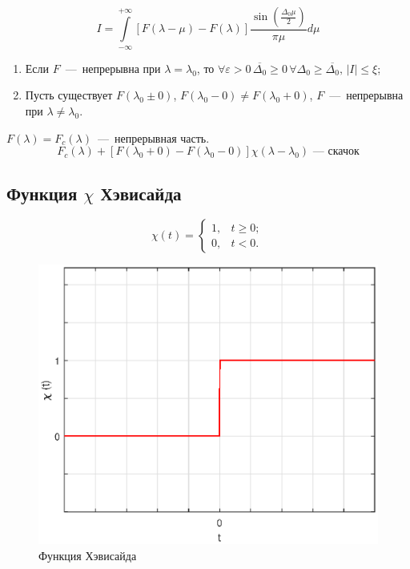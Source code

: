 \begin{equation*}
I = \int\limits_{-\infty}^{+\infty} [F(\lambda - \mu) - F(\lambda)]  \frac{\sin \left( \frac{\Delta_0 \mu}{2} \right)}{\pi \mu} d \mu
\end{equation*}

\begin{enumerate}

\item Если $F$~---~непрерывна при $\lambda = \lambda_0$, то $\forall \varepsilon >0 \,\overline{\Delta_0} \geq 0 \, \forall \Delta_0 \geq \overline{\Delta_0}, \, |I| \leq \xi$;

\item Пусть существует $F(\lambda_0 \pm 0)$, $F(\lambda_0 - 0) \neq F(\lambda_0 + 0)$, $F$~---~непрерывна при $\lambda \neq \lambda_0$.
\end{enumerate}

$F(\lambda) = F_c(\lambda)$~---~непрерывная часть.
\begin{equation*}
F_c(\lambda) + [F(\lambda_0 + 0) - F(\lambda_0 - 0)] \chi(\lambda - \lambda_0)\text{~---~скачок}
\end{equation*}

\subsection*{Функция $\chi$ Хэвисайда}
\begin{equation*}
\chi (t) = \begin{cases} 1, & t \geq 0; \\ 0, & t < 0. \end{cases}
\end{equation*}

\begin{figure}[h]
\begin{center}
\includegraphics[width=0.6\linewidth]{ch8/ch8_fig1.eps}
\caption{Функция Хэвисайда}
\label{ch1.fig1}
\end{center}
\end{figure}


